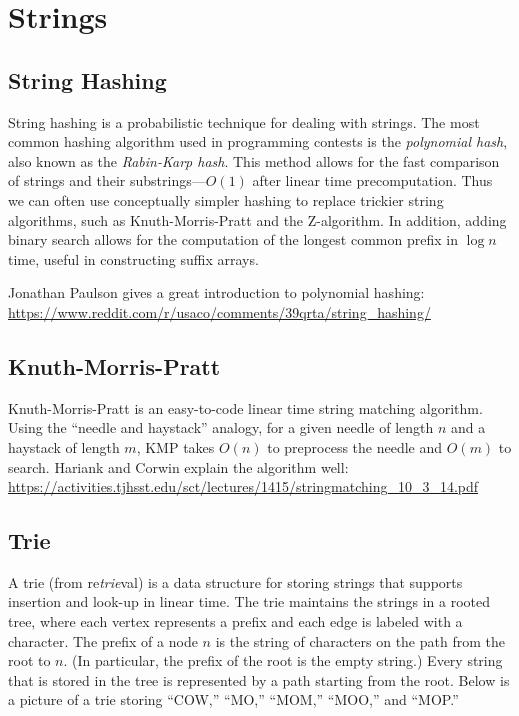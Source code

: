 \chapter{Strings}

\section{String Hashing}

String hashing is a probabilistic technique for dealing with strings. The most common hashing algorithm used in programming contests is the \emph{polynomial hash}, also known as the \emph{Rabin-Karp hash}. This method allows for the fast comparison of strings and their substrings---$O(1)$ after linear time precomputation. Thus we can often use conceptually simpler hashing to replace trickier string algorithms, such as Knuth-Morris-Pratt and the Z-algorithm. In addition, adding binary search allows for the computation of the longest common prefix in $\log n$ time, useful in constructing suffix arrays.

Jonathan Paulson gives a great introduction to polynomial hashing: \url{https://www.reddit.com/r/usaco/comments/39qrta/string_hashing/}

\section{Knuth-Morris-Pratt}

Knuth-Morris-Pratt is an easy-to-code linear time string matching algorithm. Using the ``needle and haystack'' analogy, for a given needle of length $n$ and a haystack of length $m$, KMP takes $O(n)$ to preprocess the needle and $O(m)$ to search. Hariank and Corwin explain the algorithm well: \url{https://activities.tjhsst.edu/sct/lectures/1415/stringmatching_10_3_14.pdf}

\section{Trie}

A trie (from re\emph{trie}val) is a data structure for storing strings that supports insertion and look-up in linear time. The trie maintains the strings in a rooted tree, where each vertex represents a prefix and each edge is labeled with a character. The prefix of a node $n$ is the string of characters on the path from the root to $n$. (In particular, the prefix of the root is the empty string.) Every string that is stored in the tree is represented by a path starting from the root. Below is a picture of a trie storing ``COW,'' ``MO,'' ``MOM,'' ``MOO,'' and ``MOP.''

